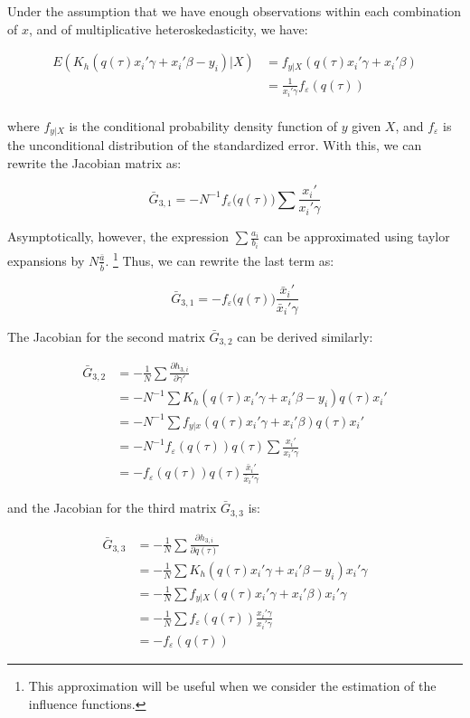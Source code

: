 \documentclass[
  authoryear,
  review,
  1p]{elsarticle}
\begin{document}
Under the assumption that we have enough observations within each
combination of \(x\), and of multiplicative heteroskedasticity, we have:

\[\begin{aligned}
E(K_h(q(\tau) x_i'\gamma +x_i'\beta - y_i )|X) &= f_{y|X}(q(\tau) x_i'\gamma +x_i'\beta) \\
&=\frac{1}{x_i'\gamma} f_{\varepsilon}(q(\tau)) \\
\end{aligned}
\]

where \(f_{y|X}\) is the conditional probability density function of
\(y\) given \(X\), and \(f_\varepsilon\) is the unconditional
distribution of the standardized error. With this, we can rewrite the
Jacobian matrix as:

\[\bar G_{3,1} = -N^{-1} f_{\varepsilon}\big(q(\tau)\big) \sum  \frac{x_i'}{x_i'\gamma} 
\]

Asymptotically, however, the expression \(\sum\frac{a_i}{b_i}\) can be
approximated using taylor expansions by \(N\frac{\bar a}{\bar b}\).
\footnote{This approximation will be useful when we consider the
  estimation of the influence functions.} Thus, we can rewrite the last
term as:

\[\bar G_{3,1} = - f_{\varepsilon}\big(q(\tau)) \frac{\bar x_i'}{\bar x_i'\gamma} 
\]

The Jacobian for the second matrix \(\bar G_{3,2}\) can be derived
similarly:

\[\begin{aligned}
\bar G_{3,2} &= -\frac{1}{N} \sum \frac{\partial h_{3,i}}{\partial \gamma'} \\
             &= -N^{-1} \sum K_h(q(\tau) x_i'\gamma +x_i'\beta - y_i ) q(\tau) x_i' \\
             &=-N^{-1} \sum f_{y|x}(q(\tau) x_i'\gamma +x_i'\beta ) q(\tau) x_i' \\
             &=-N^{-1} f_{\varepsilon}(q(\tau)) q(\tau) \sum \frac{x_i'}{x_i'\gamma} \\
             &=- f_{\varepsilon}(q(\tau)) q(\tau) \frac{\bar x_i'}{\bar x_i'\gamma}
\end{aligned}
\]

and the Jacobian for the third matrix \(\bar G_{3,3}\) is:

\[\begin{aligned}
\bar G_{3,3} &= -\frac{1}{N} \sum \frac{\partial h_{3,i}}{\partial q(\tau)} \\
 &= -\frac{1}{N} \sum K_h(q(\tau) x_i'\gamma +x_i'\beta - y_i ) x_i'\gamma \\
 &= -\frac{1}{N} \sum f_{y|X}(q(\tau) x_i'\gamma +x_i'\beta) x_i'\gamma \\
 &= -\frac{1}{N} \sum f_{\varepsilon}(q(\tau)) \frac{x_i'\gamma}{ x_i'\gamma} \\
 &= - f_{\varepsilon}(q(\tau)) 
\end{aligned}
\]
\end{document}
